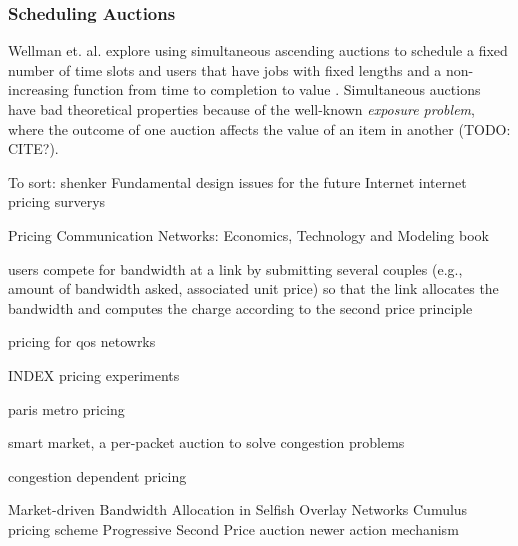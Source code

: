 \subsubsection{Scheduling Auctions}
Wellman et. al. explore using simultaneous ascending auctions to schedule a fixed number of time slots and users that have jobs with fixed lengths and a non-increasing function from time to completion to value \cite{wellman01, wellman05}.
Simultaneous auctions have bad theoretical properties because of the well-known \emph{exposure problem}, where the outcome of one auction affects the value of an item in another (TODO: CITE?).


To sort:
shenker Fundamental design issues for the future Internet \cite{shenker95}
internet pricing surverys\cite{stiller01, falkner00}

Pricing Communication Networks: Economics, Technology and Modeling book \cite{courcoubetis03}

users compete for bandwidth at a link by submitting several couples (e.g., amount of bandwidth asked, associated unit price) so that the link allocates the bandwidth and computes the charge according to the second price principle \cite{maille06}

pricing for qos netowrks \cite{dasilva00}

INDEX pricing experiments \cite{altmann99, edell99}

paris metro pricing \cite{odlyzko99}

smart market, a per-packet auction to solve congestion problems

congestion dependent pricing \cite{paschalidis00}

Market-driven Bandwidth Allocation in Selfish Overlay Networks \cite{wang05}
Cumulus pricing scheme \cite{reichl01, stiller01cumulus, reichl01edgepricing, reichl03, hayel05}
Progressive Second Price auction  \cite{lazar98, lazar99, semret99, semret00,maille03, bitsaki05}
newer action mechanism \cite{dramitinos07}
